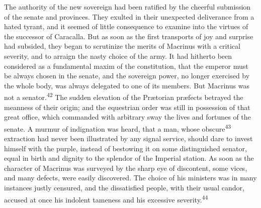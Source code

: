 
The authority of the new sovereign had been ratified by the
cheerful submission of the senate and provinces. They exulted in
their unexpected deliverance from a hated tyrant, and it seemed
of little consequence to examine into the virtues of the
successor of Caracalla. But as soon as the first transports of
joy and surprise had subsided, they began to scrutinize the
merits of Macrinus with a critical severity, and to arraign the
nasty choice of the army. It had hitherto been considered as a
fundamental maxim of the constitution, that the emperor must be
always chosen in the senate, and the sovereign power, no longer
exercised by the whole body, was always delegated to one of its
members. But Macrinus was not a senator.\textsuperscript{42} The sudden elevation
of the Prætorian præfects betrayed the meanness of their origin;
and the equestrian order was still in possession of that great
office, which commanded with arbitrary sway the lives and
fortunes of the senate. A murmur of indignation was heard, that a
man, whose obscure\textsuperscript{43} extraction had never been illustrated by
any signal service, should dare to invest himself with the
purple, instead of bestowing it on some distinguished senator,
equal in birth and dignity to the splendor of the Imperial
station. As soon as the character of Macrinus was surveyed by the
sharp eye of discontent, some vices, and many defects, were
easily discovered. The choice of his ministers was in many
instances justly censured, and the dissatisfied people, with
their usual candor, accused at once his indolent tameness and his
excessive severity.\textsuperscript{44}



